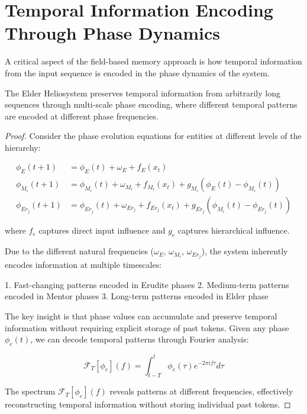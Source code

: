 \section{Temporal Information Encoding Through Phase Dynamics}

A critical aspect of the field-based memory approach is how temporal information from the input sequence is encoded in the phase dynamics of the system.

\begin{theorem}
The Elder Heliosystem preserves temporal information from arbitrarily long sequences through multi-scale phase encoding, where different temporal patterns are encoded at different phase frequencies.
\end{theorem}

\begin{proof}
Consider the phase evolution equations for entities at different levels of the hierarchy:

\begin{align}
\phi_E(t+1) &= \phi_E(t) + \omega_E + f_E(x_t) \\
\phi_{M_i}(t+1) &= \phi_{M_i}(t) + \omega_{M_i} + f_{M_i}(x_t) + g_{M_i}(\phi_E(t) - \phi_{M_i}(t)) \\
\phi_{Er_j}(t+1) &= \phi_{Er_j}(t) + \omega_{Er_j} + f_{Er_j}(x_t) + g_{Er_j}(\phi_{M_i}(t) - \phi_{Er_j}(t))
\end{align}

where $f_e$ captures direct input influence and $g_e$ captures hierarchical influence.

Due to the different natural frequencies ($\omega_E$, $\omega_{M_i}$, $\omega_{Er_j}$), the system inherently encodes information at multiple timescales:

1. Fast-changing patterns encoded in Erudite phases
2. Medium-term patterns encoded in Mentor phases
3. Long-term patterns encoded in Elder phase

The key insight is that phase values can accumulate and preserve temporal information without requiring explicit storage of past tokens. Given any phase $\phi_e(t)$, we can decode temporal patterns through Fourier analysis:

\begin{equation}
\mathcal{F}_T[\phi_e](f) = \int_{t-T}^{t} \phi_e(\tau) e^{-2\pi i f \tau} d\tau
\end{equation}

The spectrum $\mathcal{F}_T[\phi_e](f)$ reveals patterns at different frequencies, effectively reconstructing temporal information without storing individual past tokens.
\end{proof}

